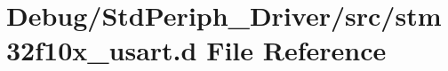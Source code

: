 \hypertarget{stm32f10x__usart_8d}{}\section{Debug/\+Std\+Periph\+\_\+\+Driver/src/stm32f10x\+\_\+usart.d File Reference}
\label{stm32f10x__usart_8d}

